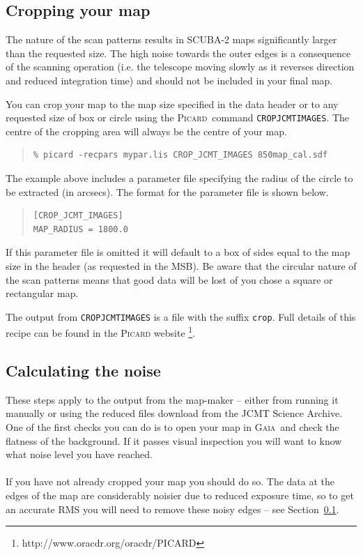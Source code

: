 \documentclass[twoside,11pt]{article}
\newcommand{\htmladdnormallink}[2]{#1}
\newcommand{\latex}[1]{#1}
\newcommand{\xref}[3]{#1}
\newcommand{\xlabel}[1]{}
\renewcommand{\_}{\texttt{\symbol{95}}}
\newenvironment{myquote}{\begin{quote}\begin{small}}{\end{small}\end{quote}}
\newcommand{\gaia}{\xref{\textsc{Gaia}}{sun214}{}}
\newcommand{\picard}{\xref{\textsc{Picard}}{sun265}{}}
\newcommand{\param}[1]{\texttt{#1}}
\begin{document}
\subsection{\xlabel{crop}Cropping your map}
\label{sec:crop}

The nature of the scan patterns results in SCUBA-2 maps significantly
larger than the requested size. The high noise towards the outer edges
is a consequence of the scanning operation (i.e. the telescope moving
slowly as it reverses direction and reduced integration time) and
should not be included in your final map.

You can crop your map to the map size specified in the data header or
to any requested size of box or circle using the \picard\ command
\param{CROP\_JCMT\_IMAGES}. The centre of the cropping area will
always be the centre of your map.
\begin{myquote}
\begin{verbatim}
% picard -recpars mypar.lis CROP_JCMT_IMAGES 850map_cal.sdf
\end{verbatim}
\end{myquote}
The example above includes a parameter file specifying the radius of
the circle to be extracted (in arcsecs).  The format for the parameter
file is shown below.
\begin{myquote}
\begin{verbatim}
[CROP_JCMT_IMAGES]
MAP_RADIUS = 1800.0
\end{verbatim}
\end{myquote}
If this parameter file is omitted it will default to a box of sides
equal to the map size in the header (as requested in the MSB). Be
aware that the circular nature of the scan patterns means that good
data will be lost of you chose a square or rectangular map.

The output from \param{CROP\_JCMT\_IMAGES} is a file with the suffix
\texttt{\_crop}. Full details of this recipe can be found in the
\htmladdnormallink{\textsc{Picard} website}{http://www.oracdr.org/oracdr/PICARD}
\latex{\footnote{http://www.oracdr.org/oracdr/PICARD}}.

\subsection{\xlabel{noise}Calculating the noise}

These steps apply to the output from the map-maker -- either from
running it manually or using the reduced files download from the JCMT
Science Archive. One of the first checks you can do is to open your
map in \gaia\ and check the flatness of the background. If it passes
visual inspection you will want to know what noise level you have
reached.
\\ \\
If you have not already cropped your map you should do so. The data at
the edges of the map are considerably noisier due to reduced exposure
time, so to get an accurate RMS you will need to remove these noisy
edges -- see Section~\ref{sec:crop}.
\end{document}
